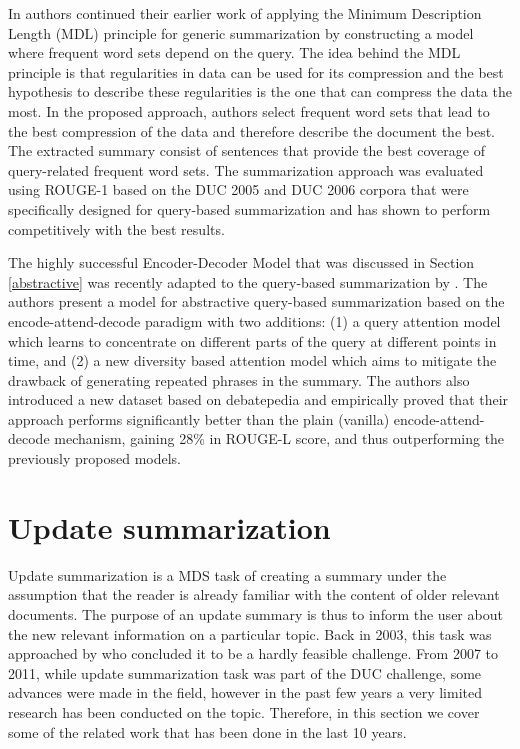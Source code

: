 \documentclass[11pt,a4paper,onecolumn]{article}
\begin{document}
In \cite{litvak2017query} authors continued their earlier work \cite{litvak2015krimping} of applying the Minimum Description Length (MDL) principle for generic summarization by constructing a model where frequent word sets depend on the query.
The idea behind the MDL principle is that regularities in data can be used for its compression and the best hypothesis to describe these regularities is the one that can compress the data the most.
In the proposed approach, authors select frequent word sets that lead to the best compression of the data and therefore describe the document the best.
The extracted summary consist of sentences that provide the best coverage of query-related frequent word sets.
The summarization approach was evaluated using ROUGE-1 based on the DUC 2005 and DUC 2006 corpora that were specifically designed for query-based summarization and has shown to perform competitively with the best results.

The highly successful Encoder-Decoder Model that was discussed in Section \ref{abstractive} was recently adapted to the query-based summarization by \cite{nema2017diversity}.
The authors present a model for abstractive query-based summarization based on the encode-attend-decode paradigm with two additions: (1) a query attention model which learns to concentrate on different parts of the query at different points in time, and (2) a new diversity based attention model which aims to mitigate the drawback of generating repeated phrases in the summary.
The authors also introduced a new dataset based on debatepedia and empirically proved that their approach performs significantly better than the plain (vanilla) encode-attend-decode mechanism, gaining 28\% in ROUGE-L score, and thus outperforming the previously proposed models.

\section{Update summarization}
Update summarization is a MDS task of creating a summary under the assumption that the reader is already familiar with the content of older relevant documents.
The purpose of an update summary is thus to inform the user about the new relevant information on a particular topic.
Back in 2003, this task was approached by \cite{allan2003retrieval} who concluded it to be a hardly feasible challenge.
From 2007 to 2011, while update summarization task was part of the DUC challenge, some advances were made in the field, however in the past few years a very limited research has been conducted on the topic.
Therefore, in this section we cover some of the related work that has been done in the last 10 years.
\end{document}
